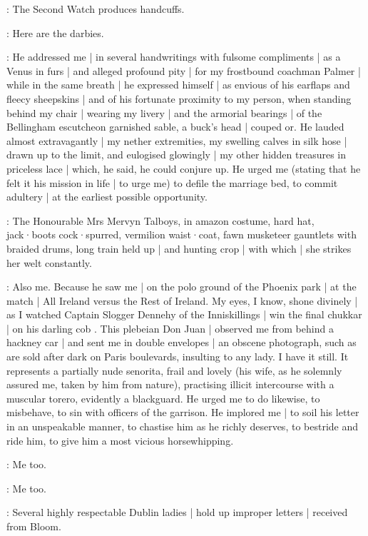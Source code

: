 :
The Second Watch produces handcuffs.

\SecondWatch:
Here are the darbies.

\Bellingham:
He addressed me |
in several handwritings with fulsome compliments |
as a Venus in furs |
and alleged profound pity |
for my frostbound coachman Palmer |
while in the same breath |
he expressed himself |
as envious of his earflaps and fleecy sheepskins |
and of his fortunate proximity to my person,
when standing behind my chair |
wearing my livery |
and the armorial bearings |
of the Bellingham escutcheon garnished sable,
a buck's head |
couped or.
He lauded almost extravagantly |
my nether extremities,
my swelling calves in silk hose |
drawn up to the limit,
and eulogised glowingly |
my other hidden treasures in priceless lace |
which,
he said,
he could conjure up.
He urged me
(stating that he felt it his mission in life |
to urge me)
to defile the marriage bed,
to commit adultery |
at the earliest possible opportunity.

:
The Honourable Mrs Mervyn Talboys,
in amazon costume,
hard hat,
jack·boots cock·spurred,
vermilion waist·coat,
fawn musketeer gauntlets with braided drums,
long train held up |
and hunting crop |
with which |
she strikes her welt constantly.

\Talboys:
Also me.
Because he saw me |
on the polo ground of the Phoenix park |
at the match |
All Ireland versus the Rest of Ireland.
My eyes,
I know,
shone divinely |
as I watched Captain Slogger Dennehy of the Inniskillings |
win the final chukkar |
on his darling cob .
This plebeian Don Juan |
observed me from behind a hackney car |
and sent me in double envelopes |
an obscene photograph,
such as are sold after dark on Paris boulevards,
insulting to any lady.
I have it still.
It represents a partially nude senorita,
frail and lovely
(his wife,
as he solemnly assured me,
taken by him from nature),
practising illicit intercourse with a muscular torero,
evidently a blackguard.
He urged me to do likewise,
to misbehave,
to sin with officers of the garrison.
He implored me |
to soil his letter in an unspeakable manner,
to chastise him as he richly deserves,
to bestride and ride him,
to give him a most vicious horsewhipping.

\Bellingham:
Me too.

\Yelverton:
Me too.

:
Several highly respectable Dublin ladies |
hold up improper letters |
received from Bloom.

